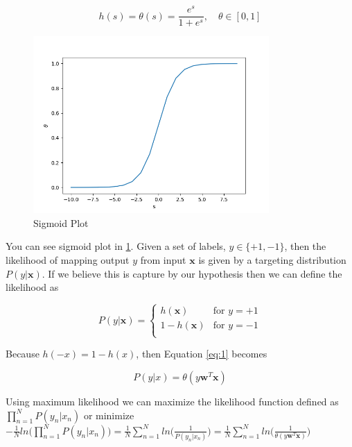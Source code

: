 \documentclass[12pt]{article}
\begin{document}
\begin{equation}
    h(s) = \theta(s) = \frac{e^s}{1+e^s}, \quad \theta \in [0, 1]
\end{equation}




\begin{figure}[ht!]
\center
\includegraphics[width=90mm]{sigmoid.png}
    \caption{Sigmoid Plot}
    \label{sigmoid}
\end{figure}



You can see sigmoid plot in \ref{sigmoid}. Given a set of labels, $y \in \{+1, -1\}$, then the likelihood of mapping output $y$ from input $\textbf{x}$ is given by a targeting distribution $P(y|\textbf{x})$. If we believe this is capture by our hypothesis then we can define the likelihood as

\begin{equation}
\label{eq:1}
 P(y|\textbf{x}) =
    \begin{cases}
      h(\textbf{x}) & \text{for $y = +1$}\\
      1 - h(\textbf{x}) & \text{for $y = -1$}\\
      \end{cases}       
\end{equation}

Because $h(-x) = 1 - h(x)$, then Equation \ref{eq:1} becomes 

\begin{equation}
    \label{eq:2}
    P(y|x) = \theta(y\textbf{w}^T\textbf{x})
\end{equation}

Using maximum likelihood we can maximize the likelihood function defined as $ {\displaystyle \prod_{n=1}^N P(y_n | x_n)}$ or minimize $-\frac{1}{N}ln\Big({\displaystyle \prod_{n=1}^N P(y_n | x_n)}\Big) = \frac{1}{N}{\displaystyle \sum_{n=1}^N} ln\Big(\frac{1}{P(y_n | x_n)}\Big) = \frac{1}{N}{\displaystyle \sum_{n=1}^N} ln\Big(\frac{1}{\theta(y\textbf{w}^T\textbf{x})}\Big) $
\end{document}
